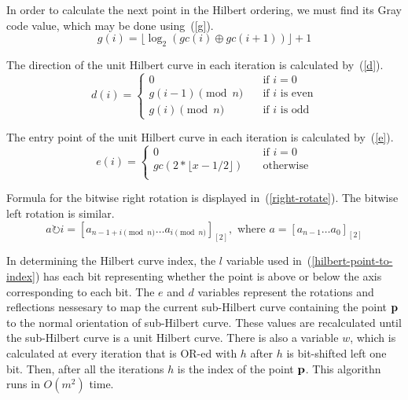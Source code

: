 \documentclass[10pt]{article}
\begin{document}
In order to calculate the next point in the Hilbert ordering, we must find its Gray code value, which may be done using~(\ref{g}).
\begin{equation}
  \label{g}
  g(i) = \lfloor \log _{2} \left( gc(i) \oplus gc(i+1) \right) \rfloor + 1
\end{equation}


The direction of the unit Hilbert curve in each iteration is calculated by~(\ref{d}).
\begin{equation}
  \label{d}
  d(i) = 
    \begin{cases}
      0 & \quad \text{if $i = 0$}\\
      g(i - 1) \pmod{n} & \quad \text{if $i$ is even} \\
      g(i) \pmod{n} & \quad \text{if $i$ is odd}
    \end{cases}
\end{equation}

The entry point of the unit Hilbert curve in each iteration is calculated by~(\ref{e}).
\begin{equation}
  \label{e}
  e(i) =  
    \begin{cases}
      0 & \quad \text{if $i = 0$}\\
      gc(2 * \lfloor x-1/2 \rfloor) & \quad \text{otherwise} \\
    \end{cases}
\end{equation}

Formula for the bitwise right rotation is displayed in~(\ref{right-rotate}). The bitwise left rotation is similar.
\begin{equation}
  \label{right-rotate}
  a \rightturn i = \left[ a_{{n - 1 + i}\pmod{n}} \ldots a_{i\pmod{n}} \right]_{\left[ 2 \right]}, \text{ where } a = \left[ a_{n-1} \ldots a_0\right]_{\left[ 2 \right]} 
\end{equation}

In determining the Hilbert curve index, the $l$ variable used in~(\ref{hilbert-point-to-index}) has each bit representing whether the point is above or below the axis corresponding to each bit. The $e$ and $d$ variables represent the rotations and reflections nessesary to map the current sub-Hilbert curve containing the point ${\bf p}$ to the normal orientation of sub-Hilbert curve. These values are recalculated until the sub-Hilbert curve is a unit Hilbert curve. There is also a variable $w$, which is calculated at every iteration that is OR-ed with $h$ after $h$ is bit-shifted left one bit. Then, after all the iterations $h$ is the index of the point ${\bf p}$. This algorithn runs in $O(m^2)$ time.
\end{document}
